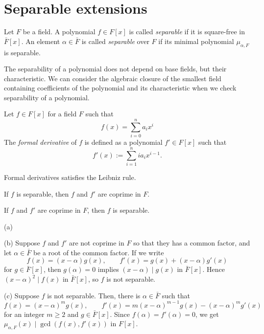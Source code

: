 \documentclass{../../large}
\begin{document}
\section{Separable extensions}


\begin{prb}
Let $F$ be a field.
A polynomial $f\in F[x]$ is called \emph{separable} if it is square-free in $\bar F[x]$.
An element $\alpha\in\bar F$ is called \emph{separable} over $F$ if its minimal polynomial $\mu_{\alpha,F}$ is separable.
\end{prb}

The separability of a polynomial does not depend on base fields, but their characteristic.
We can consider the algebraic closure of the smallest field containing coefficients of the polynomial and its characteristic when we check separability of a polynomial.

\begin{prb}
Let $f\in F[x]$ for a field $F$ such that
\[f(x)=\sum_{i=0}^na_ix^i\]
The \emph{formal derivative} of $f$ is defined as a polynomial $f'\in F[x]$ such that
\[f'(x):=\sum_{i=1}^nia_ix^{i-1}.\]
\begin{parts}
\item Formal derivatives satisfies the Leibniz rule.
\item If $f$ is separable, then $f$ and $f'$ are coprime in $F$.
\item If $f$ and $f'$ are coprime in $F$, then $f$ is separable.
\end{parts}
\end{prb}
\begin{pf}
(a)

(b)
Suppose $f$ and $f'$ are not coprime in $F$ so that they has a common factor, and let $\alpha\in\bar F$ be a root of the common factor.
If we write
\[f(x)=(x-\alpha)g(x),\qquad f'(x)=g(x)+(x-\alpha)g'(x)\]
for $g\in\bar F[x]$, then $g(\alpha)=0$ implies $(x-\alpha)\mid g(x)$ in $\bar F[x]$.
Hence $(x-\alpha)^2\mid f(x)$ in $\bar F[x]$, so $f$ is not separable.

(c)
Suppose $f$ is not separable.
Then, there is $\alpha\in\bar F$ such that
\[f(x)=(x-\alpha)^mg(x),\qquad f'(x)=m(x-\alpha)^{m-1}g(x)-(x-\alpha)^mg'(x)\]
for an integer $m\ge2$ and $g\in\bar F[x]$.
Since $f(\alpha)=f'(\alpha)=0$, we get $\mu_{\alpha,F}(x)\mid\gcd(f(x),f'(x))$ in $F[x]$.
\end{pf}
\end{document}
